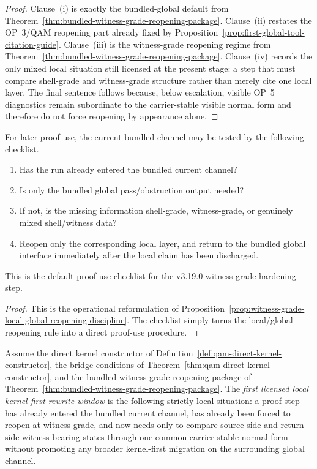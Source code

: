 \begin{proof}
Clause~(i) is exactly the bundled-global default from Theorem~\ref{thm:bundled-witness-grade-reopening-package}. Clause~(ii) restates the OP~3/QAM reopening part already fixed by Proposition~\ref{prop:first-global-tool-citation-guide}. Clause~(iii) is the witness-grade reopening regime from Theorem~\ref{thm:bundled-witness-grade-reopening-package}. Clause~(iv) records the only mixed local situation still licensed at the present stage: a step that must compare shell-grade and witness-grade structure rather than merely cite one local layer. The final sentence follows because, below escalation, visible OP~5 diagnostics remain subordinate to the carrier-stable visible normal form and therefore do not force reopening by appearance alone.
\end{proof}

\begin{corollary}
\label{cor:witness-grade-reopening-checklist}
For later proof use, the current bundled channel may be tested by the following checklist.
\begin{enumerate}[leftmargin=2em,label=(\roman*)]
\item Has the run already entered the bundled current channel?
\item Is only the bundled global pass/obstruction output needed?
\item If not, is the missing information shell-grade, witness-grade, or genuinely mixed shell/witness data?
\item Reopen only the corresponding local layer, and return to the bundled global interface immediately after the local claim has been discharged.
\end{enumerate}
This is the default proof-use checklist for the v3.19.0 witness-grade hardening step.
\end{corollary}

\begin{proof}
This is the operational reformulation of Proposition~\ref{prop:witness-grade-local-global-reopening-discipline}. The checklist simply turns the local/global reopening rule into a direct proof-use procedure.
\end{proof}

\begin{definition}
\label{def:first-licensed-local-kernel-first-rewrite-window}
Assume the direct kernel constructor of Definition~\ref{def:qam-direct-kernel-constructor}, the bridge conditions of Theorem~\ref{thm:qam-direct-kernel-constructor}, and the bundled witness-grade reopening package of Theorem~\ref{thm:bundled-witness-grade-reopening-package}. The \emph{first licensed local kernel-first rewrite window} is the following strictly local situation: a proof step has already entered the bundled current channel, has already been forced to reopen at witness grade, and now needs only to compare source-side and return-side witness-bearing states through one common carrier-stable normal form without promoting any broader kernel-first migration on the surrounding global channel.
\end{definition}

